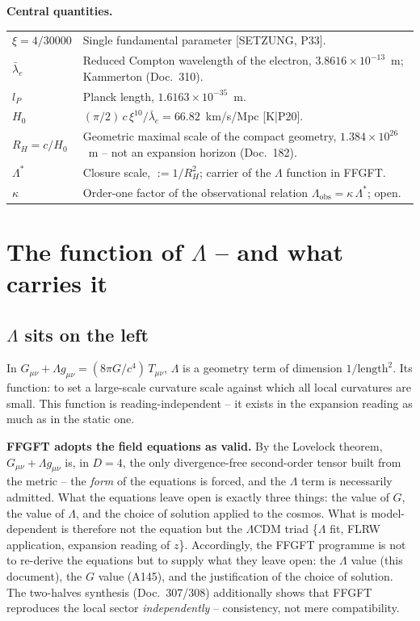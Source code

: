 \documentclass[11pt]{report}
\begin{document}
\medskip
\noindent\textbf{Central quantities.}

\medskip
\begin{tabular}{@{}lp{10.5cm}}
$\xi = 4/30000$ & Single fundamental parameter [SETZUNG, P33]. \\[4pt]
$\bar\lambda_e$ & Reduced Compton wavelength of the electron,
                  $3.8616\times10^{-13}$~m; Kammerton (Doc.~310). \\[4pt]
$l_P$           & Planck length, $1.6163\times10^{-35}$~m. \\[4pt]
$H_0$           & $(\pi/2)\,c\,\xi^{10}/\bar\lambda_e
                   = 66.82$~km/s/Mpc [K|P20]. \\[4pt]
$R_H = c/H_0$   & Geometric maximal scale of the compact geometry,
                  $1.384\times10^{26}$~m -- not an expansion horizon
                  (Doc.~182). \\[4pt]
$\Lambda^{*}$   & Closure scale, $:= 1/R_H^2$; carrier of the
                  $\Lambda$ function in FFGFT. \\[4pt]
$\kappa$        & Order-one factor of the observational relation
                  $\Lambda_\text{obs} = \kappa\,\Lambda^{*}$; open. \\
\end{tabular}

\chapter{The function of $\Lambda$ -- and what carries it}
\label{ch:funktion}

\section{$\Lambda$ sits on the left}
\label{sec:links}

In $G_{\mu\nu} + \Lambda g_{\mu\nu} = (8\pi G/c^4)\,T_{\mu\nu}$,
$\Lambda$ is a geometry term of dimension $1/\text{length}^2$. Its
function: to set a large-scale curvature scale against which all
local curvatures are small. This function is reading-independent --
it exists in the expansion reading as much as in the static one.

\textbf{FFGFT adopts the field equations as valid.} By the Lovelock
theorem, $G_{\mu\nu} + \Lambda g_{\mu\nu}$ is, in $D=4$, the only
divergence-free second-order tensor built from the metric -- the
\emph{form} of the equations is forced, and the $\Lambda$ term is
necessarily admitted. What the equations leave open is exactly three
things: the value of $G$, the value of $\Lambda$, and the choice of
solution applied to the cosmos. What is model-dependent is therefore
not the equation but the $\Lambda$CDM triad
\{$\Lambda$ fit, FLRW application, expansion reading of $z$\}.
Accordingly, the FFGFT programme is not to re-derive the equations
but to supply what they leave open: the $\Lambda$ value (this
document), the $G$ value (A145), and the justification of the choice
of solution. The two-halves synthesis (Doc.~307/308) additionally
shows that FFGFT reproduces the local sector \emph{independently} --
consistency, not mere compatibility.
\end{document}
